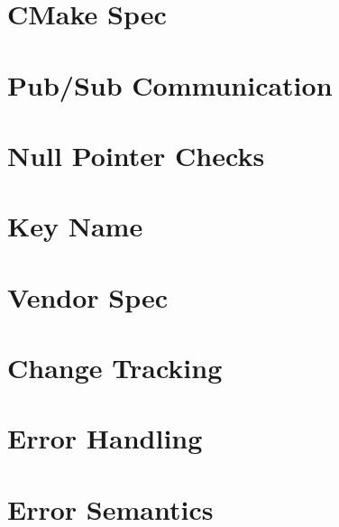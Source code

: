 \let\mypdfximage\pdfximage\def\pdfximage{\immediate\mypdfximage}\documentclass[twoside]{book}
\newcommand{\+}{\discretionary{\mbox{\scriptsize$\hookleftarrow$}}{}{}}
\begin{document}
\chapter{CMake Spec}
\label{doc_decisions_0b_rejected_cmake_spec_md}

\chapter{Pub/\+Sub Communication}
\label{doc_decisions_0b_rejected_elektra_web_pubsub_md}

\chapter{Null Pointer Checks}
\label{doc_decisions_0b_rejected_null_pointer_checks_md}

\chapter{Key Name}
\label{doc_decisions_0b_rejected_separate_key_name_md}

\chapter{Vendor Spec}
\label{doc_decisions_0b_rejected_vendor_spec_md}

\chapter{Change Tracking}
\label{doc_decisions_1_problem_clear_change_tracking_md}

\chapter{Error Handling}
\label{doc_decisions_1_problem_clear_error_handling_md}

\chapter{Error Semantics}
\label{doc_decisions_1_problem_clear_error_semantics_md}

\end{document}
